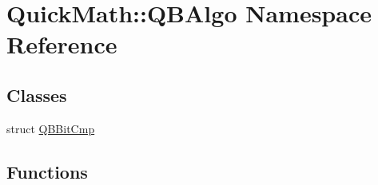 \hypertarget{namespaceQuickMath_1_1QBAlgo}{}\section{Quick\+Math\+:\+:Q\+B\+Algo Namespace Reference}
\label{namespaceQuickMath_1_1QBAlgo}
\subsection*{Classes}
\begin{DoxyCompactItemize}
\item 
struct \hyperlink{structQuickMath_1_1QBAlgo_1_1QBBitCmp}{Q\+B\+Bit\+Cmp}
\end{DoxyCompactItemize}
\subsection*{Functions}
